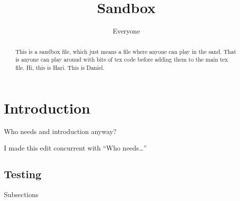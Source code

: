 \documentclass{article}
\title{Sandbox}
\author{Everyone}
\begin{document}
\maketitle

\begin{abstract}
    This is a sandbox file, which just means a file where anyone can
    play in the sand. That is anyone can play around with bits of tex
    code before adding them to the main tex file. Hi, this is
    Hari. This is Daniel.
\end{abstract}

\section{Introduction}

Who needs and introduction anyway?

I made this edit concurrent with ``Who needs\ldots''

\subsection{Testing}

Subsections
\end{document}
